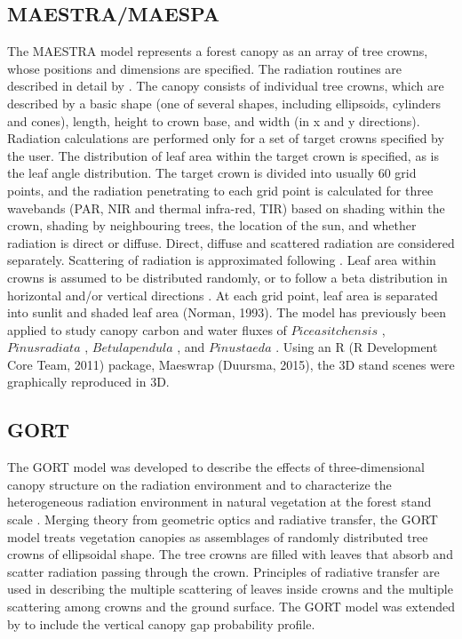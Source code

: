 \subsection{MAESTRA/MAESPA}
The MAESTRA model \citep{Wang1990,Medlyn2004,Medlyn2007,Duursma2012} represents a forest canopy as an array of tree crowns, whose positions and dimensions are specified. The radiation routines are described in detail by \citet{Wang1990}. The canopy consists of individual tree crowns, which are described by a basic shape (one of several shapes, including ellipsoids, cylinders and cones), length, height to crown base, and width (in x and y directions). Radiation calculations are performed only for a set of target crowns specified by the user. The distribution of leaf area within the target crown is specified, as is the leaf angle distribution. The target crown is divided into usually 60 grid points, and the radiation penetrating to each grid point is calculated for three wavebands (PAR, NIR and thermal infra-red, TIR) based on shading within the crown, shading by neighbouring trees, the location of the sun, and whether radiation is direct or diffuse. Direct, diffuse and scattered radiation are considered separately. Scattering of radiation is approximated following \citet{Norman1979}. Leaf area within crowns is assumed to be distributed randomly, or to follow a beta distribution in horizontal and/or vertical directions \citep{Wang1990}. At each grid point, leaf area is separated into sunlit and shaded leaf area (Norman, 1993). The model has previously been applied to study canopy carbon and water fluxes of $Picea sitchensis$ \citep{Wang1990}, $Pinus radiata$ \citep{McMurtrie1993}, $Betula pendula$ \citep{Wang1998}, and $Pinus taeda$ \citep{Luo2001}. 
Using an R (R Development Core Team, 2011) package, Maeswrap (Duursma, 2015), the 3D stand scenes were graphically reproduced in 3D.

\subsection{GORT} 
The GORT model was developed to describe the effects of three-dimensional canopy structure on the radiation environment and to characterize the heterogeneous radiation environment in natural vegetation at the forest stand scale \citep{Li1995}. Merging theory from geometric optics and radiative transfer, the GORT model treats vegetation canopies as assemblages of randomly distributed tree crowns of ellipsoidal shape. The tree crowns are filled with leaves that absorb and scatter radiation passing through the crown. Principles of radiative transfer are used in describing the multiple scattering of leaves inside crowns and the multiple scattering among crowns and the ground surface. The GORT model was extended by \citet{Ni1997} to include the vertical canopy gap probability profile.

